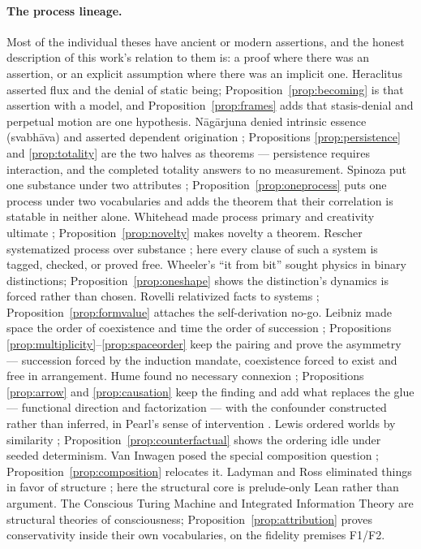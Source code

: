 \documentclass[11pt]{article}
\theoremstyle{remark}
\begin{document}
\paragraph{The process lineage.} Most of the individual theses have ancient or modern assertions, and the honest description of this work's relation to them is: a proof where there was an assertion, or an explicit assumption where there was an implicit one. Heraclitus asserted flux and the denial of static being; Proposition~\ref{prop:becoming} is that assertion with a model, and Proposition~\ref{prop:frames} adds that stasis-denial and perpetual motion are one hypothesis. N\=ag\=arjuna denied intrinsic essence (svabh\=ava) and asserted dependent origination \cite{nagarjuna}; Propositions \ref{prop:persistence} and \ref{prop:totality} are the two halves as theorems --- persistence requires interaction, and the completed totality answers to no measurement. Spinoza put one substance under two attributes \cite{spinoza1677}; Proposition~\ref{prop:oneprocess} puts one process under two vocabularies and adds the theorem that their correlation is statable in neither alone. Whitehead made process primary and creativity ultimate \cite{whitehead1929}; Proposition~\ref{prop:novelty} makes novelty a theorem. Rescher systematized process over substance \cite{rescher1996}; here every clause of such a system is tagged, checked, or proved free. Wheeler's ``it from bit'' \cite{wheeler1990} sought physics in binary distinctions; Proposition~\ref{prop:oneshape} shows the distinction's dynamics is forced rather than chosen. Rovelli relativized facts to systems \cite{rovelli1996}; Proposition~\ref{prop:formvalue} attaches the self-derivation no-go. Leibniz made space the order of coexistence and time the order of succession \cite{leibnizclarke}; Propositions \ref{prop:multiplicity}--\ref{prop:spaceorder} keep the pairing and prove the asymmetry --- succession forced by the induction mandate, coexistence forced to exist and free in arrangement. Hume found no necessary connexion \cite{hume1739}; Propositions \ref{prop:arrow} and \ref{prop:causation} keep the finding and add what replaces the glue --- functional direction and factorization --- with the confounder constructed rather than inferred, in Pearl's sense of intervention \cite{pearl2000}. Lewis ordered worlds by similarity \cite{lewis1973}; Proposition~\ref{prop:counterfactual} shows the ordering idle under seeded determinism. Van Inwagen posed the special composition question \cite{vaninwagen1990}; Proposition~\ref{prop:composition} relocates it. Ladyman and Ross eliminated things in favor of structure \cite{ladymanross2007}; here the structural core is prelude-only Lean rather than argument. The Conscious Turing Machine \cite{blum2022} and Integrated Information Theory \cite{tononi2016,kleinertull2021} are structural theories of consciousness; Proposition~\ref{prop:attribution} proves conservativity inside their own vocabularies, on the fidelity premises F1/F2.
\end{document}
